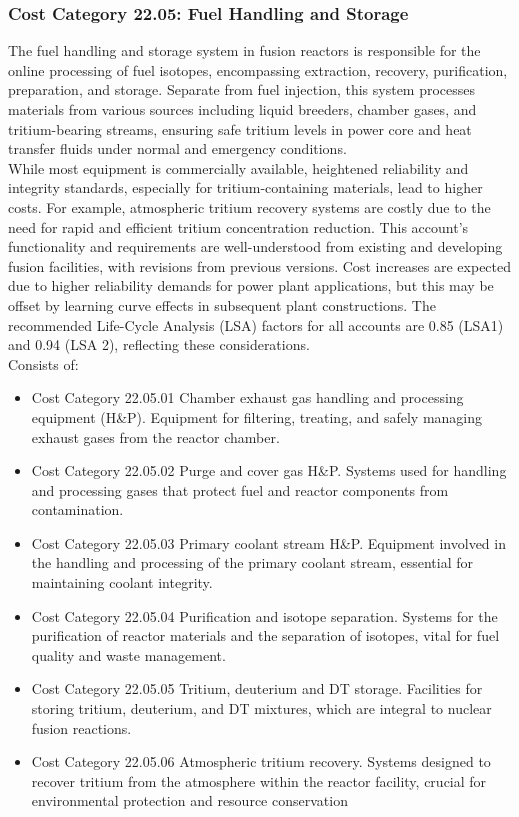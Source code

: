 
\subsubsection{Cost Category 22.05: Fuel Handling and Storage}

The fuel handling and storage system in fusion reactors is responsible for the online processing of fuel isotopes, encompassing extraction, recovery, purification, preparation, and storage. Separate from fuel injection, this system processes materials from various sources including liquid breeders, chamber gases, and tritium-bearing streams, ensuring safe tritium levels in power core and heat transfer fluids under normal and emergency conditions.  \\

While most equipment is commercially available, heightened reliability and integrity standards, especially for tritium-containing materials, lead to higher costs. For example, atmospheric tritium recovery systems are costly due to the need for rapid and efficient tritium concentration reduction. This account's functionality and requirements are well-understood from existing and developing fusion facilities, with revisions from previous versions. Cost increases are expected due to higher reliability demands for power plant applications, but this may be offset by learning curve effects in subsequent plant constructions. The recommended Life-Cycle Analysis (LSA) factors for all accounts are 0.85 (LSA1) and 0.94 (LSA 2), reflecting these considerations.\\

  Consists of: 

\begin{itemize}
\item Cost Category 22.05.01 Chamber exhaust gas handling and processing equipment (H\&P).  Equipment for filtering, treating, and safely managing exhaust gases from the reactor chamber.
\item Cost Category 22.05.02 Purge and cover gas H\&P. Systems used for handling and processing gases that protect fuel and reactor components from contamination.
\item Cost Category 22.05.03 Primary coolant stream H\&P. Equipment involved in the handling and processing of the primary coolant stream, essential for maintaining coolant integrity.
\item Cost Category 22.05.04 Purification and isotope separation. Systems for the purification of reactor materials and the separation of isotopes, vital for fuel quality and waste management.
\item Cost Category 22.05.05 Tritium, deuterium and DT storage. Facilities for storing tritium, deuterium, and DT mixtures, which are integral to nuclear fusion reactions. 
\item Cost Category 22.05.06 Atmospheric tritium recovery. Systems designed to recover tritium from the atmosphere within the reactor facility, crucial for environmental protection and resource conservation
\end{itemize}

